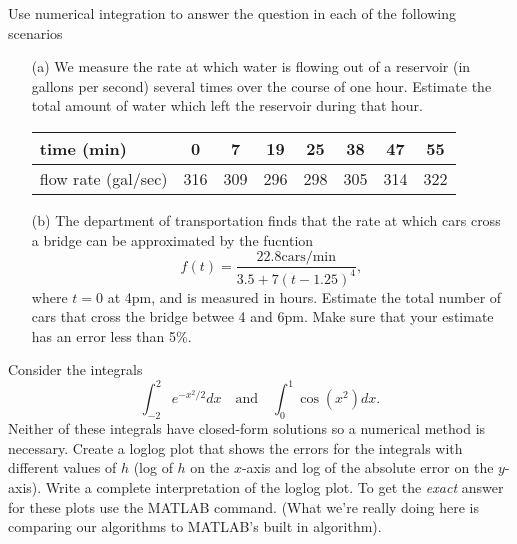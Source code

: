 \begin{problem}
    Use numerical integration to answer the question in each of the following scenarios
    \begin{enumerate}
        \item[(a)] We measure the rate at which water is flowing out of a reservoir (in
            gallons per second) several times over the course of one hour.  Estimate the
            total amount of water which left the reservoir during that hour.
            \begin{center}
                \begin{tabular}{|l||c|c|c|c|c|c|c|}
                    \hline
                    time (min) & 0 & 7 & 19 & 25 & 38 & 47 & 55 \\ \hline
                    flow rate (gal/sec) & 316 & 309 & 296 & 298 & 305 & 314 & 322 \\ \hline
                \end{tabular}
            \end{center}
        \item[(b)] The department of transportation finds that the rate at which cars
            cross a bridge can be approximated by the fucntion
            \[ f(t) = \frac{22.8 \text{cars/min}}{3.5 + 7(t-1.25)^4}, \]
            where $t=0$ at 4pm, and is measured in hours.  Estimate the total number of
            cars that cross the bridge betwee 4 and 6pm.  Make sure that your estimate has
            an error less than 5\%.
    \end{enumerate}
\end{problem}


\begin{problem}
    Consider the integrals 
    \[ \int_{-2}^2 e^{-x^2/2} dx \quad \text{and} \quad \int_0^1 \cos(x^2) dx. \]
    Neither of these integrals have closed-form solutions so a numerical method is
    necessary.  Create a loglog plot that shows the errors for the integrals with different values of $h$ (log
    of $h$ on the $x$-axis and log of the absolute error on the $y$-axis).
    Write a complete interpretation of the loglog plot.  
    To get the {\it exact} answer for these plots use the MATLAB  command.
    (What we're really doing here is comparing our algorithms to MATLAB's built in algorithm).
\end{problem}


